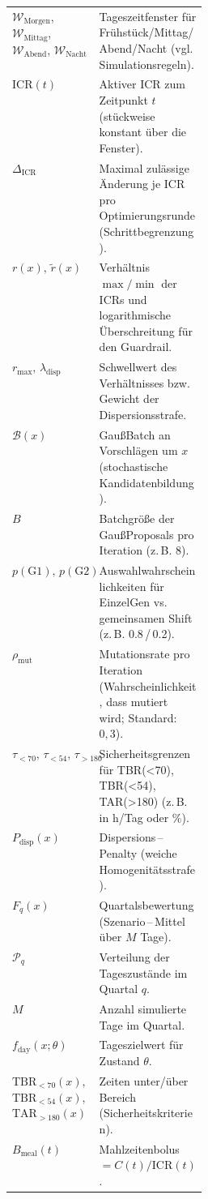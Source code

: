 \documentclass[ngerman,a4paper,12pt,pdftex]{article}
\newcommand{\ICR}{\mathrm{ICR}}
\newcommand{\DICR}{\Delta_{\mathrm{ICR}}}
\newcommand{\rmax}{r_{\max}}
\newcommand{\lambdadisp}{\lambda_{\mathrm{disp}}}
\begin{document}
\begin{table}[p]
\begin{tabularx}{\linewidth}{@{}>{\raggedright\arraybackslash}p{0.28\linewidth}X@{}}
$\mathcal W_{\mathrm{Morgen}}$, $\mathcal W_{\mathrm{Mittag}}$, $\mathcal W_{\mathrm{Abend}}$, $\mathcal W_{\mathrm{Nacht}}$ & Tageszeitfenster f\"ur Fr\"uhst\"uck/Mittag/Abend/Nacht (vgl. Simulationsregeln). \\
$\ICR(t)$                  & Aktiver ICR zum Zeitpunkt $t$ (st\"uckweise konstant \"uber die Fenster). \\
$\DICR$                    & Maximal zul\"assige \"Anderung je ICR pro Optimierungsrunde (Schrittbegrenzung). \\
$r(x),\,\tilde r(x)$      & Verh\"altnis $\max/\min$ der ICRs und logarithmische \"Uberschreitung f\"ur den Guardrail. \\
$\rmax,\,\lambdadisp$    & Schwellwert des Verh\"altnisses bzw. Gewicht der Dispersionsstrafe. \\
$\mathcal B(x)$           & Gau{\ss}\-Batch an Vorschl\"agen um $x$ (stochastische Kandidatenbildung). \\
$B$                        & Batchgr\"o\ss e der Gau{\ss}\-Proposals pro Iteration (z.\,B. 8). \\
$p(\text{G1}),\,p(\text{G2})$ & Auswahlwahrscheinlichkeiten f\"ur Einzel\-Gen vs. gemeinsamen Shift (z.\,B. 0.8\,/\,0.2). \\
$\rho_{\mathrm{mut}}$           & Mutationsrate pro Iteration (Wahrscheinlichkeit, dass mutiert wird; Standard: $0{,}3$). \\
$\tau_{<70},\,\tau_{<54},\,\tau_{>180}$ & Sicherheitsgrenzen f\"ur TBR(<70), TBR(<54), TAR(>180) (z.\,B. in h/Tag oder \%). \\
$P_{\mathrm{disp}}(x)$    & Dispersions\,–\,Penalty (weiche Homogenit\"atsstrafe). \\
$F_q(x)$                  & Quartalsbewertung (Szenario\,–\,Mittel \"uber $M$ Tage). \\
$\mathcal P_q$            & Verteilung der Tageszust\"ande im Quartal $q$. \\
$M$                       & Anzahl simulierte Tage im Quartal. \\
$f_{\text{day}}(x;\theta)$ & Tageszielwert f\"ur Zustand $\theta$. \\
$\mathrm{TBR}_{<70}(x)$, $\mathrm{TBR}_{<54}(x)$, $\mathrm{TAR}_{>180}(x)$ & Zeiten unter/\"uber Bereich (Sicherheitskriterien). \\
$B_{\mathrm{meal}}(t)$   & Mahlzeitenbolus $=C(t)/\ICR(t)$. \\
\hline
\end{tabularx}
\end{table}
\FloatBarrier
\end{document}
